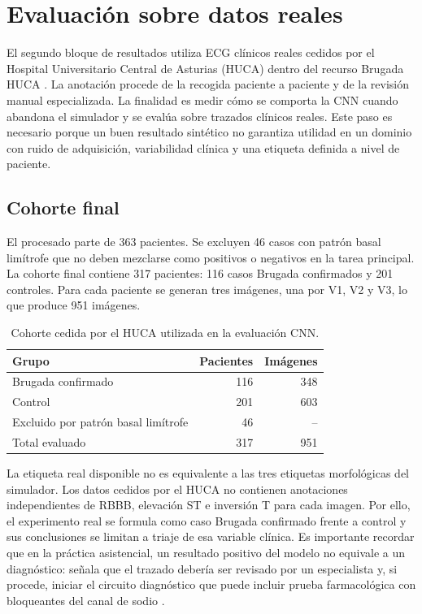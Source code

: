 \chapter{Evaluación sobre datos reales}
\label{chap:datos_reales}

El segundo bloque de resultados utiliza ECG clínicos reales cedidos por el Hospital Universitario Central de Asturias (HUCA) dentro del recurso Brugada HUCA \cite{costacortez2026brugada}. La anotación procede de la recogida paciente a paciente y de la revisión manual especializada. La finalidad es medir cómo se comporta la CNN cuando abandona el simulador y se evalúa sobre trazados clínicos reales. Este paso es necesario porque un buen resultado sintético no garantiza utilidad en un dominio con ruido de adquisición, variabilidad clínica y una etiqueta definida a nivel de paciente.

\section{Cohorte final}

El procesado parte de 363 pacientes. Se excluyen 46 casos con patrón basal limítrofe que no deben mezclarse como positivos o negativos en la tarea principal. La cohorte final contiene 317 pacientes: 116 casos Brugada confirmados y 201 controles. Para cada paciente se generan tres imágenes, una por V1, V2 y V3, lo que produce 951 imágenes.

\begin{table}[H]
  \centering
  \begin{tabular}{lrr}
    \toprule
    Grupo & Pacientes & Imágenes \\
    \midrule
    Brugada confirmado & 116 & 348 \\
    Control & 201 & 603 \\
    Excluido por patrón basal limítrofe & 46 & -- \\
    \midrule
    Total evaluado & 317 & 951 \\
    \bottomrule
  \end{tabular}
  \caption{Cohorte cedida por el HUCA utilizada en la evaluación CNN.}
  \label{tab:huca_cohorte_final}
\end{table}

La etiqueta real disponible no es equivalente a las tres etiquetas morfológicas del simulador. Los datos cedidos por el HUCA no contienen anotaciones independientes de RBBB, elevación ST e inversión T para cada imagen. Por ello, el experimento real se formula como caso Brugada confirmado frente a control y sus conclusiones se limitan a triaje de esa variable clínica. Es importante recordar que en la práctica asistencial, un resultado positivo del modelo no equivale a un diagnóstico: señala que el trazado debería ser revisado por un especialista y, si procede, iniciar el circuito diagnóstico que puede incluir prueba farmacológica con bloqueantes del canal de sodio \cite{wilde2023scbt}.

